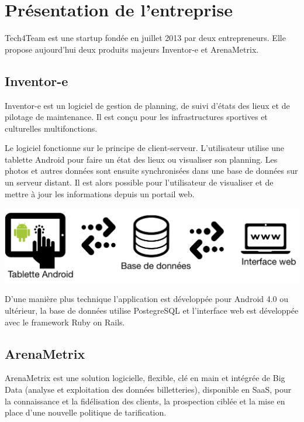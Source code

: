

\chapter{Présentation de l'entreprise}


Tech4Team est une startup fondée en juillet 2013 par deux entrepreneurs. Elle propose aujourd'hui deux produits majeurs Inventor-e et ArenaMetrix.

\section{Inventor-e}
Inventor-e est un logiciel de gestion de planning, de suivi d’états des lieux et de pilotage de maintenance. Il est conçu pour les infrastructures sportives et culturelles multifonctions.

Le logiciel fonctionne sur le principe de client-serveur. L'utilisateur utilise une tablette Android pour faire un état des lieux ou visualiser son planning. Les photos et autres données sont ensuite synchronisées dans une base de données sur un serveur distant. Il est alors possible pour l'utilisateur de visualiser et de mettre à jour les informations depuis un portail web.

\begin{center}
\includegraphics[scale=0.7]{images/inventore.png}
\label{inventore}
\end{center}

D'une manière plus technique l'application est développée pour Android 4.0 ou ultérieur, la base de données utilise PostegreSQL et l'interface web est développée avec le framework Ruby on Rails.

\section{ArenaMetrix}
ArenaMetrix est une solution logicielle, flexible, clé en main et intégrée de Big Data (analyse et exploitation des données billetteries), disponible en SaaS, pour la connaissance et la fidélisation des clients, la prospection ciblée et la mise en place d'une nouvelle politique de tarification.
\\

